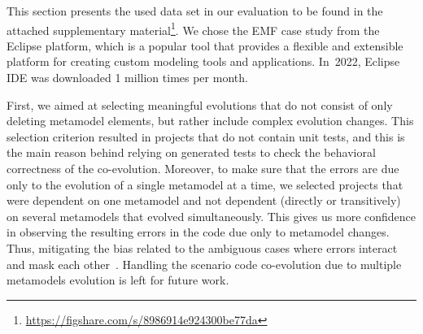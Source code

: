 	This section presents the used data set in our evaluation to be found in the attached supplementary material\footnote{\url{https://figshare.com/s/8986914e924300be77da}}.
	We chose the EMF case study from the Eclipse platform, which is a popular tool that provides a flexible and extensible platform for creating custom modeling tools and applications. In~2022, Eclipse IDE was downloaded 1 million times per month.
	
	First, we aimed at selecting meaningful evolutions that do not consist of only deleting metamodel elements, but rather include complex evolution changes. 
	\red{}This selection criterion resulted in projects that do not contain unit tests, and this is the main reason behind relying on generated tests to check the behavioral correctness of the co-evolution. %
	Moreover, to make sure that the errors are due only to the evolution of a single metamodel at a time, we selected projects that were dependent on one metamodel and not dependent (directly or transitively) on several metamodels that evolved simultaneously. This gives us more confidence in observing the resulting errors in the code due only to metamodel changes. Thus, mitigating the bias related to the ambiguous cases where errors interact and mask each other~\cite{bohme2013regression}. Handling the scenario code co-evolution due to multiple metamodels evolution is left for future work. 
	

